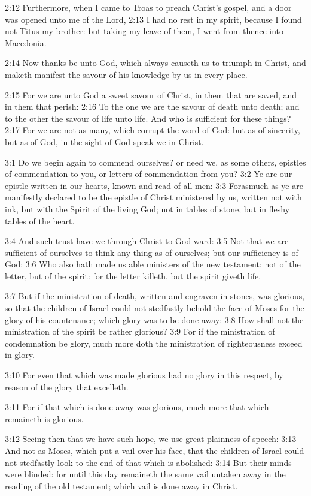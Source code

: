2:12 Furthermore, when I came to Troas to preach Christ's gospel, and a door was opened unto me of the Lord, 2:13 I had no rest in my spirit, because I found not Titus my brother: but taking my leave of them, I went from thence into Macedonia.

2:14 Now thanks be unto God, which always causeth us to triumph in Christ, and maketh manifest the savour of his knowledge by us in every place.

2:15 For we are unto God a sweet savour of Christ, in them that are saved, and in them that perish: 2:16 To the one we are the savour of death unto death; and to the other the savour of life unto life. And who is sufficient for these things?  2:17 For we are not as many, which corrupt the word of God: but as of sincerity, but as of God, in the sight of God speak we in Christ.

3:1 Do we begin again to commend ourselves? or need we, as some others, epistles of commendation to you, or letters of commendation from you?  3:2 Ye are our epistle written in our hearts, known and read of all men: 3:3 Forasmuch as ye are manifestly declared to be the epistle of Christ ministered by us, written not with ink, but with the Spirit of the living God; not in tables of stone, but in fleshy tables of the heart.

3:4 And such trust have we through Christ to God-ward: 3:5 Not that we are sufficient of ourselves to think any thing as of ourselves; but our sufficiency is of God; 3:6 Who also hath made us able ministers of the new testament; not of the letter, but of the spirit: for the letter killeth, but the spirit giveth life.

3:7 But if the ministration of death, written and engraven in stones, was glorious, so that the children of Israel could not stedfastly behold the face of Moses for the glory of his countenance; which glory was to be done away: 3:8 How shall not the ministration of the spirit be rather glorious?  3:9 For if the ministration of condemnation be glory, much more doth the ministration of righteousness exceed in glory.

3:10 For even that which was made glorious had no glory in this respect, by reason of the glory that excelleth.

3:11 For if that which is done away was glorious, much more that which remaineth is glorious.

3:12 Seeing then that we have such hope, we use great plainness of speech: 3:13 And not as Moses, which put a vail over his face, that the children of Israel could not stedfastly look to the end of that which is abolished: 3:14 But their minds were blinded: for until this day remaineth the same vail untaken away in the reading of the old testament; which vail is done away in Christ.

